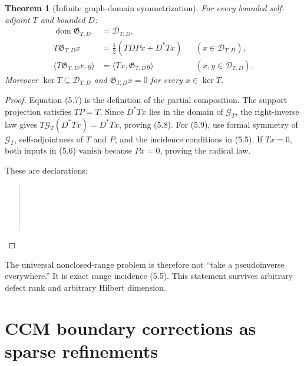 \documentclass[11pt]{article}
\newtheorem{theorem}{Theorem}[section]
\theoremstyle{definition}
\theoremstyle{remark}
\newcommand{\kerop}{\operatorname{ker}}
\begin{document}
\begin{theorem}[Infinite graph-domain symmetrization]
\label{thm:graphsymm}
For every bounded self-adjoint $T$ and bounded $D$:
\begin{align}
 \operatorname{dom}\mathfrak G_{T,D}&=\mathcal D_{T,D},                 \tag{5.7}\\
 T\mathfrak G_{T,D}x
 &=\tfrac12\left(TDPx+D^*Tx\right) &&(x\in\mathcal D_{T,D}),           \tag{5.8}\\
 \langle T\mathfrak G_{T,D}x,y\rangle
 &=\langle Tx,\mathfrak G_{T,D}y\rangle
 &&(x,y\in\mathcal D_{T,D}).                                           \tag{5.9}
\end{align}
Moreover $\kerop T\subseteq\mathcal D_{T,D}$ and
$\mathfrak G_{T,D}x=0$ for every $x\in\kerop T$.
\end{theorem}

\begin{proof}
Equation (5.7) is the definition of the partial composition.  The support projection satisfies
$TP=T$.  Since $D^*Tx$ lies in the domain of $\mathcal G_T$, the right-inverse law gives
$T\mathcal G_T(D^*Tx)=D^*Tx$, proving (5.8).  For (5.9), use formal symmetry of
$\mathcal G_T$, self-adjointness of $T$ and $P$, and the incidence conditions in (5.5).  If
$Tx=0$, both inputs in (5.6) vanish because $Px=0$, proving the radical law.

These are declarations:
\begin{quote}\footnotesize
{}\\
\\
\\
\\
\end{quote}
\end{proof}

The universal nonclosed-range problem is therefore not ``take a pseudoinverse everywhere.''  It
is exact range incidence (5.5).  This statement survives arbitrary defect rank and arbitrary
Hilbert dimension.

\section{CCM boundary corrections as sparse refinements}
\end{document}
